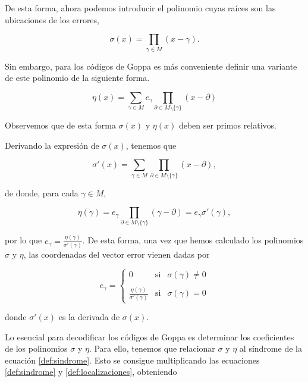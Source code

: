 De esta forma, ahora podemos introducir el polinomio cuyas raíces son las ubicaciones de los errores,

\begin{equation}
    \label{def:localizaciones}
    \sigma (x) = \prod_{\gamma \in M} (x - \gamma).
\end{equation}

Sin embargo, para los códigos de Goppa es más conveniente definir una variante de este polinomio de la siguiente forma.

\begin{equation}
    \label{def:eta}
    \eta (x) = \sum_{\gamma \in M} e_\gamma \prod_{\partial \in M \setminus \{ \gamma \} } (x - \partial)
\end{equation}

Observemos que de esta forma $\sigma(x)$ y $\eta(x)$ deben ser primos relativos.

Derivando la expresión de $\sigma(x)$, tenemos que 

\begin{equation}
    \label{def:localizaciones_derivada}
    \sigma'(x) = \sum_{\gamma \in M} \prod_{\partial \in M \setminus \{ \gamma \} } (x - \partial),
\end{equation}


de donde, para cada $\gamma \in M$,

$$\eta (\gamma) = e_\gamma \prod_{\partial \in M \setminus \{ \gamma \} } (\gamma - \partial) = e_\gamma \sigma'(\gamma),$$

por lo que $e_\gamma = \frac{\eta(\gamma)}{\sigma'(\gamma)}$. De esta forma, una vez que hemos calculado los polinomios $\sigma$ y $\eta$, las coordenadas del vector error vienen dadas por 

\[
    e_\gamma = \left\{ \begin{array}{lcc}
    0 &   \text{si}  & \sigma(\gamma) \neq 0 \\
    \\ \frac{\eta(\gamma)}{\sigma'(\gamma)} &  \text{si} & \sigma(\gamma) = 0
    \end{array}
    \right.
\]

donde $\sigma'(x)$ es la derivada de $\sigma(x)$.

Lo esencial para decodificar los códigos de Goppa es determinar los coeficientes de los polinomios $\sigma$ y $\eta$. Para ello, tenemos que relacionar $\sigma$ y $\eta$ al síndrome de la ecuación \eqref{def:sindrome}. Esto se consigue multiplicando las ecuaciones \eqref{def:sindrome} y \eqref{def:localizaciones}, obteniendo

